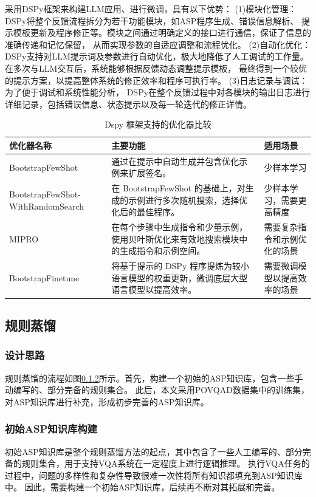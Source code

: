 采用DSPy框架来构建LLM应用、进行微调，具有以下优势：
(1)模块化管理：DSPy将整个反馈流程拆分为若干功能模块，如ASP程序生成、错误信息解析、
提示模板更新及程序修正等。模块之间通过明确定义的接口进行通信，保证了信息的准确传递和记忆保留，
从而实现参数的自适应调整和流程优化。
(2)自动化优化：DSPy支持对LLM提示词及参数进行自动优化，极大地降低了人工调试的工作量。
在多次与LLM交互后，系统能够根据反馈动态调整提示模板，
最终得到一个较优的提示方案，以提高整体系统的修正效率和程序可执行率。
(3)日志记录与调试：为了便于调试和系统性能分析，
DSPy在整个反馈过程中对各模块的输出日志进行详细记录，包括错误信息、状态提示以及每一轮迭代的修正详情。
\begin{table}[htbp]
\centering
\caption{Dspy 框架支持的优化器比较}
\label{tab:optimizer_comparison}
\begin{tabular}{|>{\raggedright}p{4cm}|>{\raggedright}p{8cm}|>{\raggedright\arraybackslash}p{4cm}|}
\hline
\textbf{优化器名称} & \textbf{主要功能} & \textbf{适用场景} \\
\hline
BootstrapFewShot & 通过在提示中自动生成并包含优化示例来扩展签名。 & 少样本学习 \\
\hline
BootstrapFewShot-
WithRandomSearch & 在 BootstrapFewShot 的基础上，对生成的示例进行多次随机搜索，选择优化后的最佳程序。 & 少样本学习，需要更高精度 \\
\hline
MIPRO & 在每个步骤中生成指令和少量示例，使用贝叶斯优化来有效地搜索模块中的生成指令和示例空间。 & 需要复杂指令和示例优化的场景 \\
\hline
BootstrapFinetune & 将基于提示的 DSPy 程序提炼为较小语言模型的权重更新，微调底层大型语言模型以提高效率。 & 需要微调模型以提高效率的场景 \\
\hline
\end{tabular}
\end{table}
\subsection{规则蒸馏}
\subsubsection{设计思路}
规则蒸馏的流程如图\ref{}所示。首先，构建一个初始的ASP知识库，包含一些手动编写的、部分完备的规则集合。
此后，本文采用POVQAD数据集中的训练集，对ASP知识库进行补充，形成初步完善的ASP知识库。

\subsubsection{初始ASP知识库构建}
初始ASP知识库是整个规则蒸馏方法的起点，其中包含了一些人工编写的、部分完备的规则集合，用于支持VQA系统在一定程度上进行逻辑推理。
执行VQA任务的过程中，问题的多样性和复杂性导致很难一次性将所有知识都填充到ASP知识库中。
因此，需要构建一个初始ASP知识库，后续再不断对其拓展和完善。


